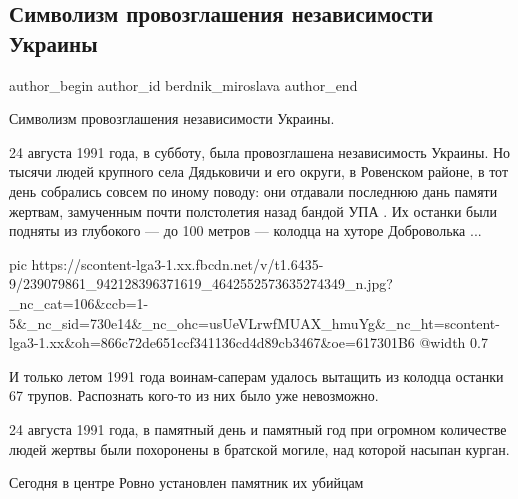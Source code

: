  
 
 
 
 
 
\subsection{Символизм провозглашения независимости Украины}
\label{sec:24_08_2021.fb.berdnik_miroslava.1.nezalezhnist_simvolizm}
 
\ifcmt
 author_begin
   author_id berdnik_miroslava
 author_end
\fi

Символизм провозглашения независимости Украины.

24 августа 1991 года, в субботу, была провозглашена независимость Украины. Но
тысячи людей крупного села Дядьковичи и его округи, в Ровенском районе, в тот
день собрались совсем по иному поводу: они отдавали последнюю дань памяти
жертвам, замученным почти полстолетия назад бандой УПА . Их останки были
подняты из глубокого — до 100 метров — колодца на хуторе Доброволька ...

\ifcmt
  pic https://scontent-lga3-1.xx.fbcdn.net/v/t1.6435-9/239079861_942128396371619_4642552573635274349_n.jpg?_nc_cat=106&ccb=1-5&_nc_sid=730e14&_nc_ohc=usUeVLrwfMUAX_hmuYg&_nc_ht=scontent-lga3-1.xx&oh=866c72de651ccf341136cd4d89cb3467&oe=617301B6
  @width 0.7
\fi

И только летом 1991 года воинам-саперам удалось  вытащить из колодца останки 67
трупов. Распознать кого-то из них было уже невозможно.

24 августа 1991 года, в памятный день и памятный год при огромном количестве
людей жертвы были похоронены в братской могиле, над которой насыпан курган.

Сегодня в центре Ровно установлен памятник их убийцам

